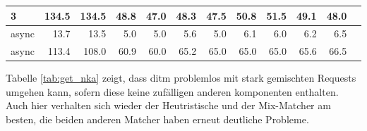 \documentclass[12pt,a4paper]{report}
\begin{document}
\begin{table}[H]
\begin{tabular}{|l|r|r|r|r|r|r|r|r|r|r|r|}
		3                        & 134.5                              & 134.5                           & 48.8                        & 47.0                      & 48.3                           & 47.5 & 50.8 & 51.5 & 49.1 & 48.0 \\ \hline
		async                    & 13.7                               & 13.5                            & 5.0                         & 5.0                       & 5.6                            & 5.0  & 6.1  & 6.0  & 6.2  & 6.5  \\ \hline
		async                    & 113.4                              & 108.0                           & 60.9                        & 60.0                      & 65.2                           & 65.0 & 65.0 & 65.0 & 65.6 & 66.5 \\ \hline
	\end{tabular}
\end{table}

Tabelle \ref{tab:get_nka} zeigt, dass ditm problemlos mit stark gemischten Requests umgehen kann, sofern diese keine zufälligen
anderen komponenten enthalten. Auch hier verhalten sich wieder der Heutristische und der Mix-Matcher am besten, die beiden anderen
Matcher haben erneut deutliche Probleme.
\end{document}
